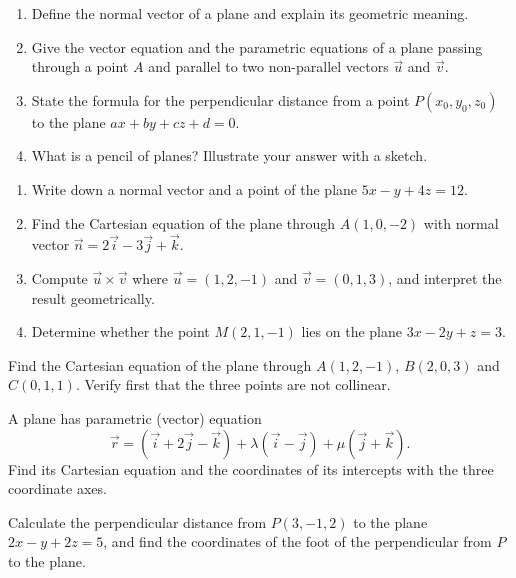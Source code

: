 \documentclass[11pt]{article}
\newcommand{\cle}[1]{{\popxbold\color{popdark}#1}}
\newcounter{popsec}
\newcounter{popsub}
\newcommand{\courssub}[1]{%
  \stepcounter{popsub}%
  \par\vspace{9pt}\noindent{\popxbold\fontsize{11.5}{13}\selectfont\color{popink}{\color{poporange}\thepopsec.\thepopsub}\hspace{6pt}#1}\par\nopagebreak\vspace{4pt}
}
\begin{document}
\begin{exercice}
\begin{enumerate}
\item Define the \cle{normal vector} of a plane and explain its geometric meaning.
\item Give the \cle{vector equation} and the \cle{parametric equations} of a plane passing through a point $A$ and parallel to two non-parallel vectors $\vec{u}$ and $\vec{v}$.
\item State the formula for the perpendicular distance from a point $P(x_0,y_0,z_0)$ to the plane $ax+by+cz+d=0$.
\item What is a \cle{pencil of planes}? Illustrate your answer with a sketch.
\end{enumerate}
\end{exercice}

\begin{exercice}
\begin{enumerate}
\item Write down a normal vector and a point of the plane $5x-y+4z=12$.
\item Find the Cartesian equation of the plane through $A(1,0,-2)$ with normal vector $\vec{n}=2\vec{i}-3\vec{j}+\vec{k}$.
\item Compute $\vec{u}\times\vec{v}$ where $\vec{u}=(1,2,-1)$ and $\vec{v}=(0,1,3)$, and interpret the result geometrically.
\item Determine whether the point $M(2,1,-1)$ lies on the plane $3x-2y+z=3$.
\end{enumerate}
\end{exercice}

\courssub{I practise}

\begin{exercice}
Find the Cartesian equation of the plane through $A(1,2,-1)$, $B(2,0,3)$ and $C(0,1,1)$. Verify first that the three points are not collinear.
\end{exercice}

\begin{exercice}
A plane has parametric (vector) equation
\[
\vec{r}=(\vec{i}+2\vec{j}-\vec{k})+\lambda(\vec{i}-\vec{j})+\mu(\vec{j}+\vec{k}).
\]
Find its Cartesian equation and the coordinates of its intercepts with the three coordinate axes.
\end{exercice}

\begin{exercice}
Calculate the perpendicular distance from $P(3,-1,2)$ to the plane $2x-y+2z=5$, and find the coordinates of the foot of the perpendicular from $P$ to the plane.
\end{exercice}
\end{document}
